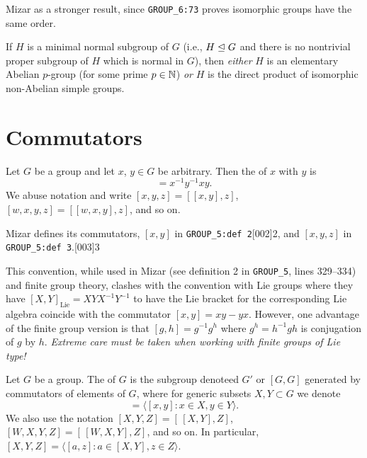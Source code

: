 \begin{thm-remark}
Mizar as a stronger result, since \verb#GROUP_6:73# proves isomorphic
groups have the same order.
\end{thm-remark}

\begin{theorem}
  If $H$ is a minimal normal subgroup of $G$ (i.e., $H\trianglelefteq G$
  and there is no nontrivial proper subgroup of $H$ which is normal in
  $G$),
  then \emph{either} $H$ is an elementary Abelian $p$-group (for some
  prime $p\in\mathbb{N}$) \emph{or} $H$ is the direct product of isomorphic
  non-Abelian simple groups.
\end{theorem}

\section{Commutators}

\begin{definition}
  Let $G$ be a group and let $x$, $y\in G$ be arbitrary.
  Then the  of $x$ with $y$ is
  \begin{equation*}
    [x,y] = x^{-1}y^{-1}xy.
  \end{equation*}
  We abuse notation and write $[x,y,z] = [{[x,y]},z]$,
  $[w,x,y,z] = [{[w,x,y]},z]$, and so on.
\end{definition}

\begin{def-remark}
Mizar defines its commutators, $[x,y]$ in \verb#GROUP_5:def 2#[002]{2}, and
$[x,y,z]$ in \verb#GROUP_5:def 3#.[003]{3}
\end{def-remark}

\begin{def-remark}
This convention, while used in Mizar (see definition 2 in \verb#GROUP_5#,
lines 329--334) and finite group theory, clashes with the convention
with Lie groups where they have $[X,Y]_{\text{Lie}}=XYX^{-1}Y^{-1}$ to
have the Lie bracket for the corresponding Lie algebra coincide with the
commutator $[x,y] = xy - yx$. However, one advantage of the finite group
version is that $[g,h] = g^{-1}g^{h}$ where $g^{h}=h^{-1}gh$ is
conjugation of $g$ by $h$. \emph{Extreme care must be taken when working
with finite groups of Lie type!}
\end{def-remark}

\begin{definition}\index{$[G,G]$}
Let $G$ be a group. The  of $G$ is the subgroup
denoteed $G'$ or $[G,G]$ generated by commutators of elements of $G$, where
for generic subsets $X,Y\subset G$ we denote
\begin{equation}
  [X,Y] = \langle [x,y] : x\in X,y\in Y\rangle.
\end{equation}
We also use the notation $[X,Y,Z] = [\,{[X,Y]},Z]$, $[W,X,Y,Z] = [\,{[W,X,Y]},Z]$,
and so on. In particular, $[X,Y,Z] = \langle [a,z] : a\in[X,Y], z\in Z\rangle$.
\end{definition}

